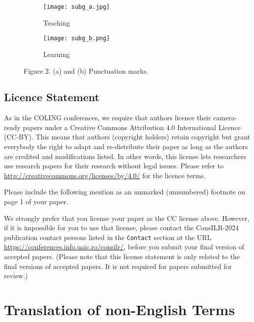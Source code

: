 \documentclass[11pt]{article}
\begin{document}
\begin{figure}[h]
\centering
  \begin{subfigure}{0.31\textwidth}
    \texttt{[image: subg\_a.jpg]}
    \caption{Teaching} \label{fig:1a}
  \end{subfigure}%
  \hspace{2cm}
  \begin{subfigure}{0.2\textwidth}
    \texttt{[image: subg\_b.png]}
    \caption{Learning} \label{fig:1b}
  \end{subfigure}%

\caption{Figure 2. (a) and (b) Punctuation marks.} \label{fig:1}
\end{figure}



\subsection{Licence Statement}
\label{licence}

As in the COLING conferences, we require that authors licence their camera-ready papers under a Creative Commons Attribution 4.0 International Licence (CC-BY). This means that authors (copyright holders) retain copyright but grant everybody the right to adapt and re-distribute their paper as long as the authors are credited and modifications listed. In other words, this license lets researchers use research papers for their research without legal issues. Please refer to \url{http://creativecommons.org/licenses/by/4.0/} for the licence terms. 

Please include the following mention as an unmarked (unnumbered) footnote on page 1 of your paper.


We strongly prefer that you license your paper as the CC license
above. However, if it is impossible for you to use that license, please
contact the ConsILR-2024 publication contact persons listed in the \texttt{Contact} section at the URL \url{https://conferences.info.uaic.ro/consilr/},
before you submit your final version of accepted papers.
(Please note that this license statement is only related to the final versions of accepted papers.
It is not required for papers submitted for review.)

\section{Translation of non-English Terms}
\end{document}

